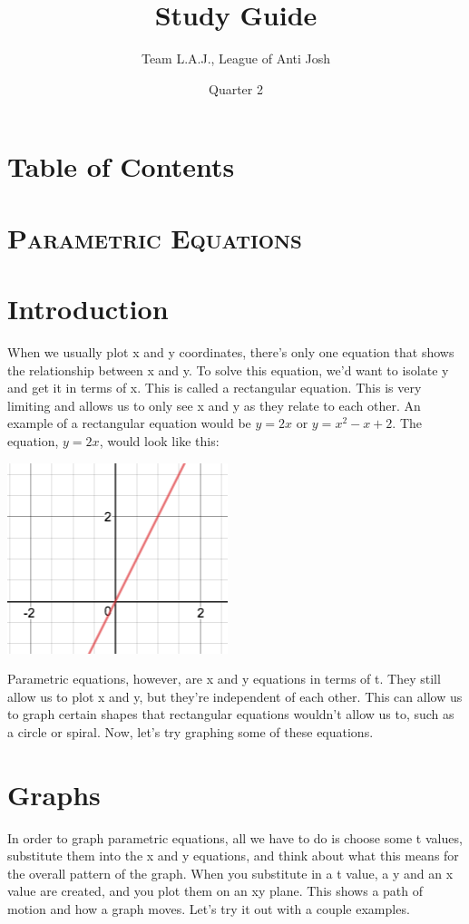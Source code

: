 \documentclass[a4paper,openright, 14pt]{article}
\title{Study Guide}
\author{Team L.A.J., League of Anti Josh}
\date{Quarter 2}
\newcommand{\ssection}[1]{%
\section[#1]{\centering\normalfont\scshape #1}}
\begin{document}
\maketitle
\section*{Table of Contents}

\ssection{Parametric Equations}
 \section*{Introduction}
 When we usually plot x and y coordinates, there's only one equation that shows the relationship between x and y. To solve this equation, we'd want to isolate y and get it in terms of x. This is called a rectangular equation. This is very limiting and allows us to only see x and y as they relate to each other. An example of a rectangular equation would be $y=2x$ or $y=x^2-x+2$. The equation, $y=2x$, would look like this:
 \begin{center}
     \includegraphics[width =4 cm, height= 3 cm]{Images/graph1.png}
 \end{center}
 Parametric equations, however, are x and y equations in terms of t. They still allow us to plot x and y, but they're independent of each other. This can allow us to graph certain shapes that rectangular equations wouldn't allow us to, such as a circle or spiral. Now, let's try graphing some of these equations.
 \section*{Graphs}
 In order to graph parametric equations, all we have to do is choose some t values, substitute them into the x and y equations, and think about what this means for the overall pattern of the graph. When you substitute in a t value, a y and an x value are created, and you plot them on an xy plane. This shows a path of motion and how a graph moves. Let’s try it out with a couple examples. 
\end{document}
